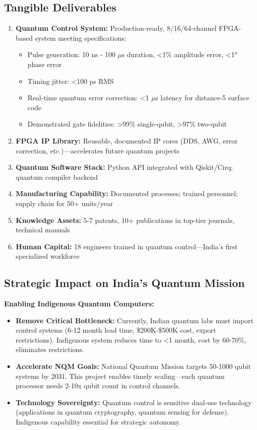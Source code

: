 \documentclass[12pt,a4paper]{article}
\begin{document}
\begin{enumerate}[leftmargin=*]
\subsection{Tangible Deliverables}

\begin{enumerate}[leftmargin=*]
    \item \textbf{Quantum Control System:} Production-ready, 8/16/64-channel FPGA-based system meeting specifications:
    \begin{itemize}
        \item Pulse generation: 10 ns - 100 $\mu$s duration, <1\% amplitude error, <1° phase error
        \item Timing jitter: <100 ps RMS
        \item Real-time quantum error correction: <1 $\mu$s latency for distance-5 surface code
        \item Demonstrated gate fidelities: >99\% single-qubit, >97\% two-qubit
    \end{itemize}
    \item \textbf{FPGA IP Library:} Reusable, documented IP cores (DDS, AWG, error correction, etc.)—accelerates future quantum projects
    \item \textbf{Quantum Software Stack:} Python API integrated with Qiskit/Cirq; quantum compiler backend
    \item \textbf{Manufacturing Capability:} Documented processes; trained personnel; supply chain for 50+ units/year
    \item \textbf{Knowledge Assets:} 5-7 patents, 10+ publications in top-tier journals, technical manuals
    \item \textbf{Human Capital:} 18 engineers trained in quantum control—India's first specialized workforce
\end{enumerate}

\subsection{Strategic Impact on India's Quantum Mission}

\textbf{Enabling Indigenous Quantum Computers:}
\begin{itemize}[leftmargin=*]
    \item \textbf{Remove Critical Bottleneck:} Currently, Indian quantum labs must import control systems (6-12 month lead time, \$200K-\$500K cost, export restrictions). Indigenous system reduces time to <1 month, cost by 60-70\%, eliminates restrictions.
    \item \textbf{Accelerate NQM Goals:} National Quantum Mission targets 50-1000 qubit systems by 2031. This project enables timely scaling—each quantum processor needs 2-10x qubit count in control channels.
    \item \textbf{Technology Sovereignty:} Quantum control is sensitive dual-use technology (applications in quantum cryptography, quantum sensing for defense). Indigenous capability essential for strategic autonomy.
\end{itemize}


\end{enumerate}
\end{document}
